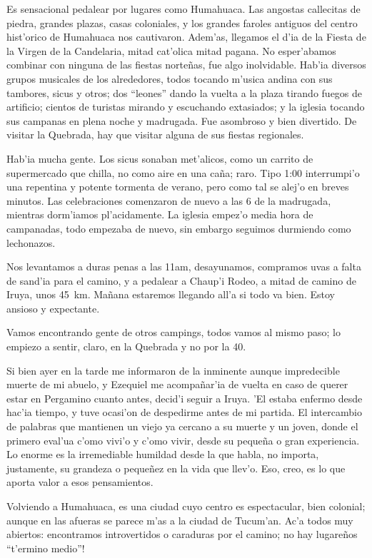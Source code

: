 Es sensacional pedalear por lugares como Humahuaca. Las angostas callecitas de
piedra, grandes plazas, casas coloniales, y los grandes faroles antiguos del
centro hist'orico de Humahuaca nos cautivaron. Adem'as, llegamos el d'ia de la
Fiesta de la Virgen de la Candelaria, mitad cat'olica mitad pagana. No
esper'abamos combinar con ninguna de las fiestas norte\~nas, fue algo
inolvidable. Hab'ia diversos grupos musicales de los alrededores, todos tocando
m'usica andina con sus tambores, sicus y otros; dos ``leones'' dando la vuelta a
la plaza tirando fuegos de artificio; cientos de turistas mirando y escuchando
extasiados; y la iglesia tocando sus campanas en plena noche y madrugada. Fue
asombroso y bien divertido. De visitar la Quebrada, hay que visitar alguna de
sus fiestas regionales.

Hab'ia mucha gente. Los sicus sonaban met'alicos, como un carrito de
supermercado que chilla, no como aire en una ca\~na; raro. Tipo 1:00
interrumpi'o una repentina y potente tormenta de verano, pero como tal se alej'o
en breves minutos. Las celebraciones comenzaron de nuevo a las 6 de la
madrugada, mientras dorm'iamos pl'acidamente. La iglesia empez'o media hora de
campanadas, todo empezaba de nuevo, sin embargo seguimos durmiendo como
lechonazos.

Nos levantamos a duras penas a las 11am, desayunamos, compramos uvas a falta de
sand'ia para el camino, y a pedalear a Chaup'i Rodeo, a mitad de camino de
Iruya, unos 45~km. Ma\~nana estaremos llegando all'a si todo va bien. Estoy
ansioso y expectante.

Vamos encontrando gente de otros campings, todos vamos al mismo paso; lo empiezo
a sentir, claro, en la Quebrada y no por la 40.

Si bien ayer en la tarde me informaron de la inminente aunque impredecible
muerte de mi abuelo, y Ezequiel me acompa\~nar'ia de vuelta en caso de querer
estar en Pergamino cuanto antes, decid'i seguir a Iruya. 'El estaba enfermo
desde hac'ia tiempo, y tuve ocasi'on de despedirme antes de mi partida. El
intercambio de palabras que mantienen un viejo ya cercano a su muerte y un
joven, donde el primero eval'ua c'omo vivi'o y c'omo vivir, desde su peque\~na
o gran experiencia. Lo enorme es la irremediable humildad desde la que habla, no
importa, justamente, su grandeza o peque\~nez en la vida que llev'o. Eso, creo,
es lo que aporta valor a esos pensamientos.

Volviendo a Humahuaca, es una ciudad cuyo centro es espectacular, bien colonial;
aunque en las afueras se parece m'as a la ciudad de Tucum'an. Ac'a todos muy
abiertos: encontramos introvertidos o caraduras por el camino; \textexclamdown
no hay lugare\~nos ``t'ermino medio''!

